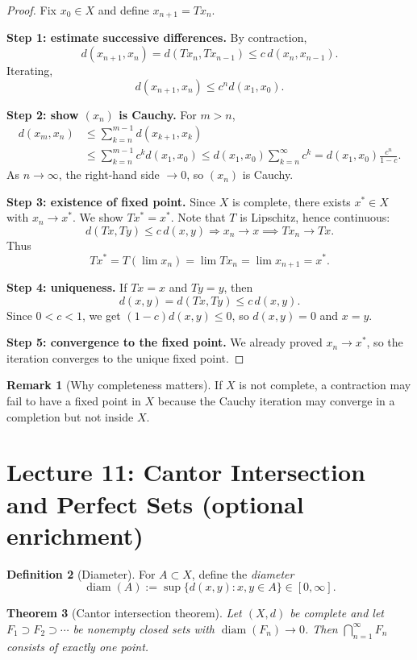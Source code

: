\documentclass[11pt]{article}
\newtheorem{theorem}{Theorem}[section]
\theoremstyle{definition}
\newtheorem{definition}[theorem]{Definition}
\newtheorem{remark}[theorem]{Remark}
\newcommand{\diam}{\operatorname{diam}}
\begin{document}
\begin{proof}
Fix $x_0\in X$ and define $x_{n+1}=Tx_n$.

\textbf{Step 1: estimate successive differences.}
By contraction,
\[
d(x_{n+1},x_n)=d(Tx_n,Tx_{n-1})\le c\,d(x_n,x_{n-1}).
\]
Iterating,
\[
d(x_{n+1},x_n)\le c^n d(x_1,x_0).
\]

\textbf{Step 2: show $(x_n)$ is Cauchy.}
For $m>n$,
\begin{align*}
d(x_m,x_n)
&\le \sum_{k=n}^{m-1} d(x_{k+1},x_k) \\
&\le \sum_{k=n}^{m-1} c^k d(x_1,x_0)
\le d(x_1,x_0)\sum_{k=n}^{\infty} c^k
= d(x_1,x_0)\frac{c^n}{1-c}.
\end{align*}
As $n\to\infty$, the right-hand side $\to 0$, so $(x_n)$ is Cauchy.

\textbf{Step 3: existence of fixed point.}
Since $X$ is complete, there exists $x^*\in X$ with $x_n\to x^*$.
We show $Tx^*=x^*$. Note that $T$ is Lipschitz, hence continuous:
\[
d(Tx,Ty)\le c\,d(x,y)\Rightarrow x_n\to x \implies Tx_n\to Tx.
\]
Thus
\[
Tx^*=T(\lim x_n)=\lim Tx_n=\lim x_{n+1}=x^*.
\]

\textbf{Step 4: uniqueness.}
If $Tx=x$ and $Ty=y$, then
\[
d(x,y)=d(Tx,Ty)\le c\,d(x,y).
\]
Since $0<c<1$, we get $(1-c)d(x,y)\le 0$, so $d(x,y)=0$ and $x=y$.

\textbf{Step 5: convergence to the fixed point.}
We already proved $x_n\to x^*$, so the iteration converges to the unique fixed point.
\end{proof}

\begin{remark}[Why completeness matters]
If $X$ is not complete, a contraction may fail to have a fixed point in $X$ because the Cauchy iteration may converge in a completion but not inside $X$.
\end{remark}

\section{Lecture 11: Cantor Intersection and Perfect Sets (optional enrichment)}

\begin{definition}[Diameter]
For $A\subset X$, define the \emph{diameter}
\[
\diam(A):=\sup\{d(x,y):x,y\in A\}\in[0,\infty].
\]
\end{definition}

\begin{theorem}[Cantor intersection theorem]
Let $(X,d)$ be complete and let $F_1\supset F_2\supset \cdots$ be nonempty closed sets with $\diam(F_n)\to 0$.
Then $\bigcap_{n=1}^\infty F_n$ consists of exactly one point.
\end{theorem}
\end{document}
